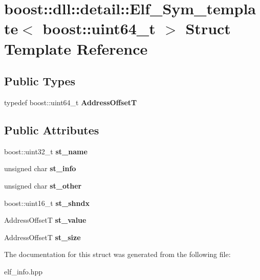 \hypertarget{a01404}{}\section{boost\+:\+:dll\+:\+:detail\+:\+:Elf\+\_\+\+Sym\+\_\+template$<$ boost\+:\+:uint64\+\_\+t $>$ Struct Template Reference}
\label{a01404}
\subsection*{Public Types}
\begin{DoxyCompactItemize}
\item 
\mbox{\label{a01404_ad1e44aba1f99d966aa2709e3bdcd47fe}} 
typedef boost\+::uint64\+\_\+t {\bfseries Address\+OffsetT}
\end{DoxyCompactItemize}
\subsection*{Public Attributes}
\begin{DoxyCompactItemize}
\item 
\mbox{\label{a01404_a622647e816f59015eafe01228113a646}} 
boost\+::uint32\+\_\+t {\bfseries st\+\_\+name}
\item 
\mbox{\label{a01404_ae28b231a04d45e9e22039be6bc174b60}} 
unsigned char {\bfseries st\+\_\+info}
\item 
\mbox{\label{a01404_aff5bd6040881e1411f92650ce08fff84}} 
unsigned char {\bfseries st\+\_\+other}
\item 
\mbox{\label{a01404_ac6f0b6c91c7c5e9ce4c4ef6e8adbf284}} 
boost\+::uint16\+\_\+t {\bfseries st\+\_\+shndx}
\item 
\mbox{\label{a01404_aa4e2698ae197ce1df4a7ea931e075cd6}} 
Address\+OffsetT {\bfseries st\+\_\+value}
\item 
\mbox{\label{a01404_a6c32a90249fb0b6c430075634bfc5db1}} 
Address\+OffsetT {\bfseries st\+\_\+size}
\end{DoxyCompactItemize}


The documentation for this struct was generated from the following file\+:\begin{DoxyCompactItemize}
\item 
elf\+\_\+info.\+hpp\end{DoxyCompactItemize}
